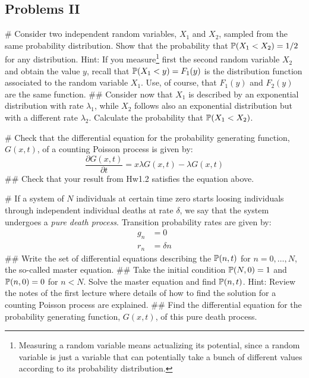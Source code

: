 \subsection*{Problems II} 

\begin{easylist}[enumerate]

# Consider two independent random variables, $X_1$ and $X_2$, sampled from the same probability distribution. Show that the probability that ${\mathbb P}(X_1 < X_2) = 1/2$ for any distribution. Hint: If you measure\footnote{Measuring a random variable means actualizing its potential, since a random variable is just a variable that can potentially take a bunch of different values according to its probability distribution.} first the second random variable $X_2$ and obtain the value $y$, recall that ${\mathbb P}(X_1 < y) = F_1(y)$ is the distribution function associated to the random variable $X_1$. Use, of course, that $F_1(y)$ and $F_2(y)$ are the same function. 
## Consider now that $X_1$ is described by an exponential distribution with rate $\lambda_1$, while $X_2$ follows also an exponential distribution but with a different rate $\lambda_2$. Calculate the probability that ${\mathbb P}(X_1 < X_2)$.  

# Check that the differential equation for the probability generating function, $G(x,t)$, of a counting Poisson process is given by:
$$\frac{\partial G(x,t)}{\partial t} = x \lambda G(x,t) - \lambda G(x,t)$$
## Check that your result from Hw1.2 satisfies the equation above.

# If a system of $N$ individuals at certain time zero starts loosing individuals through independent individual deaths at rate $\delta$, we say that the system undergoes a {\em pure death process}. Transition probability rates are given by:
\begin{align*}
	g_n &=0 \\
    r_n &=\delta n
\end{align*}
## Write the set of differential equations describing the ${\mathbb P}(n,t)$ for $n=0, \dots, N$, the so-called master equation. 
## Take the initial condition ${\mathbb P}(N,0) = 1$ and ${\mathbb P}(n,0) = 0$ for $n<N$. Solve the master equation and find ${\mathbb P}(n,t)$. Hint: Review the notes of the first lecture where details of how to find the solution for a counting Poisson process are explained. 
## Find the differential equation for the probability generating function, $G(x,t)$, of this pure death process.


\end{easylist}
